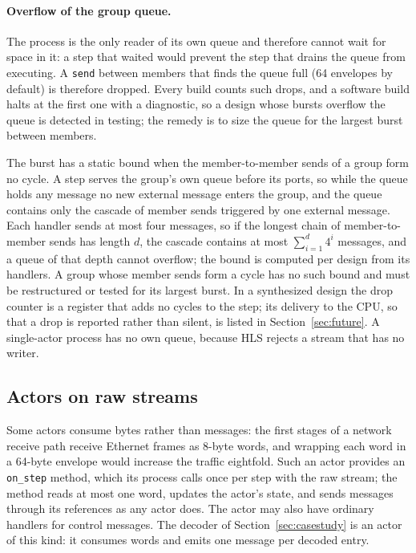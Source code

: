 \documentclass[11pt]{article}
\newcommand{\snd}{\texttt{send}}
\begin{document}
\paragraph{Overflow of the group queue.} The process is the
only reader of its own queue and therefore cannot wait for space in it: a step
that waited would prevent the step that drains the queue from executing. A
\snd{} between members that finds the queue full (64 envelopes by default) is
therefore dropped. Every build counts such drops, and a software build halts at
the first one with a diagnostic, so a design whose bursts overflow the queue is
detected in testing; the remedy is to size the queue for the largest burst
between members.

The burst has a static bound when the member-to-member sends of a group form
no cycle. A step serves the group's own queue before its ports, so while the
queue holds any message no new external message enters the group, and the
queue contains only the cascade of member sends triggered by one external
message. Each handler sends at most four messages, so if the longest chain of
member-to-member sends has length $d$, the cascade contains at most
$\sum_{i=1}^{d} 4^i$ messages, and a queue of that depth cannot overflow; the
bound is computed per design from its handlers. A group whose member sends
form a cycle has no such bound and must be restructured or tested for its
largest burst. In a synthesized design the drop counter is a register that
adds no cycles to the step; its delivery to the CPU, so that a drop is reported
rather than silent, is listed in Section~\ref{sec:future}. A single-actor
process has no own queue, because HLS rejects a stream that has no writer.

\subsection{Actors on raw streams}
\label{sec:rawstreams}

Some actors consume bytes rather than messages: the first stages of a network
receive path receive Ethernet frames as 8-byte words, and wrapping each word in
a 64-byte envelope would increase the traffic eightfold. Such an actor provides
an \texttt{on\_step} method, which its process calls once per step with the raw
stream; the method reads at most one word, updates the actor's state, and sends
messages through its references as any actor does. The actor may also have
ordinary handlers for control messages. The decoder of
Section~\ref{sec:casestudy} is an actor of this kind: it consumes words and
emits one message per decoded entry.
\end{document}
